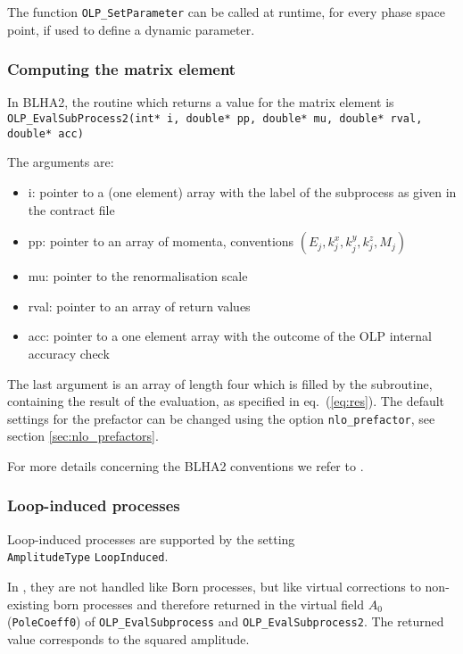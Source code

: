 The function {\tt OLP\_SetParameter} can be called at runtime, 
for every phase space point, 
if used to define a dynamic parameter. 

\subsubsection{Computing the matrix element}

In BLHA2, the routine which returns a value for the matrix element is\\
{\small {\tt OLP\_EvalSubProcess2(int* i, double* pp, double* mu, double* rval, double* acc)}}


The arguments are:
\begin{itemize}
\item i: pointer to a (one element) array with the label of the subprocess as given in the contract file
\item pp: pointer to an array of momenta, conventions $(E_j,k_j^x,k_j^y,k_j^z,M_j)$
\item mu: pointer to the renormalisation scale 
\item rval: pointer to an array of return values
\item acc: pointer to a one element array with the outcome of the 
OLP internal accuracy check 
\end{itemize}


The last argument is an array of length four which is filled by the subroutine, 
containing the result of the evaluation, as specified in eq.~(\ref{eq:res}).
The default settings for the prefactor can be changed using the option {\tt nlo\_prefactor}, 
see section \ref{sec:nlo_prefactors}.

For more details concerning the BLHA2 conventions we refer to \cite{Alioli:2013nda}.

\subsubsection{Loop-induced processes}

Loop-induced processes are supported by the setting \\
\texttt{AmplitudeType} \texttt{LoopInduced}.

In \gosam, they are not handled like Born processes, but like virtual corrections to non-existing born processes
and therefore returned in the virtual field $A_0$ (\texttt{PoleCoeff0}) of \texttt{OLP\_EvalSubprocess}
and \texttt{OLP\_EvalSubprocess2}. The returned value corresponds to
the  squared amplitude.

